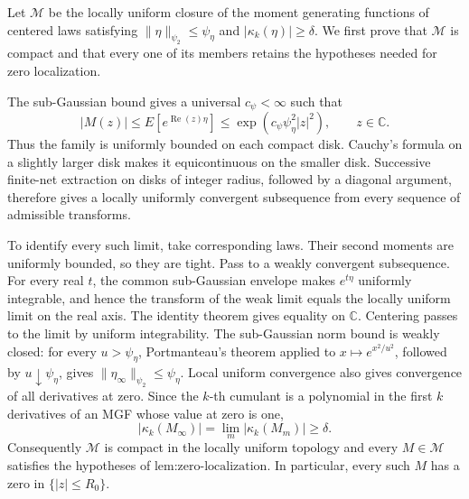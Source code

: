 Let \(\mathscr M\) be the locally uniform closure of the moment generating functions of centered laws satisfying \(\lVert\eta\rVert_{\psi_2}\le\psi_{\eta}\) and \(\lvert\kappa_k(\eta)\rvert\ge\delta\).  We first prove that \(\mathscr M\) is compact and that every one of its members retains the hypotheses needed for zero localization.

The sub-Gaussian bound gives a universal \(c_{\psi}<\infty\) such that
\[
 |M(z)|
 \le E[e^{\operatorname{Re}(z)\eta}]
 \le \exp(c_{\psi}\psi_{\eta}^2|z|^2),
 \qquad z\in\mathbb C.
\]
Thus the family is uniformly bounded on each compact disk.  Cauchy's formula on a slightly larger disk makes it equicontinuous on the smaller disk.  Successive finite-net extraction on disks of integer radius, followed by a diagonal argument, therefore gives a locally uniformly convergent subsequence from every sequence of admissible transforms.

To identify every such limit, take corresponding laws.  Their second moments are uniformly bounded, so they are tight.  Pass to a weakly convergent subsequence.  For every real \(t\), the common sub-Gaussian envelope makes \(e^{t\eta}\) uniformly integrable, and hence the transform of the weak limit equals the locally uniform limit on the real axis.  The identity theorem gives equality on \(\mathbb C\).  Centering passes to the limit by uniform integrability.  The sub-Gaussian norm bound is weakly closed: for every \(u>\psi_{\eta}\), Portmanteau's theorem applied to \(x\mapsto e^{x^2/u^2}\), followed by \(u\downarrow\psi_{\eta}\), gives \(\lVert\eta_{\infty}\rVert_{\psi_2}\le\psi_{\eta}\).  Local uniform convergence also gives convergence of all derivatives at zero.  Since the \(k\)-th cumulant is a polynomial in the first \(k\) derivatives of an MGF whose value at zero is one,
\[
 \lvert\kappa_k(M_{\infty})\rvert
 =\lim_m\lvert\kappa_k(M_m)\rvert
 \ge\delta.
\]
Consequently \(\mathscr M\) is compact in the locally uniform topology and every \(M\in\mathscr M\) satisfies the hypotheses of \(\text{lem:zero-localization}\).  In particular, every such \(M\) has a zero in \(\{|z|\le R_0\}\).

